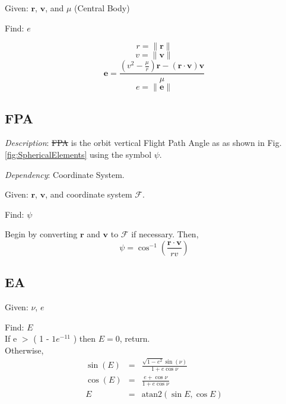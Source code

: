 \noindent Given:  $\mathbf{r}$, $\mathbf{v}$, and $\mu$ (Central
Body)

\noindent Find:  $e$

%
\begin{equation}
    r = \| \mathbf{r} \|
\end{equation}
%
\begin{equation}
    v = \| \mathbf{v} \|
\end{equation}
%
\begin{equation}
     \mathbf{e} = \displaystyle\frac{(v^2 - \displaystyle\frac{\mu}{r} )\mathbf{r}
     - (\mathbf{r}\cdot\mathbf{v}  )\mathbf{v}}{\mu}
\end{equation}
%
\begin{equation}
     e = \| \mathbf{e} \|
\end{equation}

\subsection{FPA} 

\noindent \textit{Description}: \st{FPA} is the orbit vertical
Flight Path Angle as as shown in Fig. \ref{fig:SphericalElements}
using the symbol $\psi$.

\noindent \textit{Dependency}:  Coordinate System.

\noindent Given:  $\mathbf{r}$, $\mathbf{v}$, and coordinate system
$\mathcal{F}$.

\noindent Find:  $\psi$

Begin by converting  $\mathbf{r}$ and $\mathbf{v}$ to  $\mathcal{F}$
if necessary.  Then,
%
\begin{equation}
    \psi = \cos^{-1}\left(  \frac{\mathbf{r} \cdot \mathbf{v} }{r v} \right)
\end{equation}
%

\subsection{EA} \label{sec:EccentricAnomaly}

Given: $\nu$, $e$

\noindent Find:  $E$\\
%

\noindent If e $>$ ( 1 - $1e^{-11}$ ) then $E = 0$, return.\\
%


\noindent Otherwise,
%
\begin{eqnarray}
    \sin(E) & = & \frac{\sqrt{1 - e^2} \sin(\nu)}{1+e \cos{\nu}}    \\    %
    \cos(E) & = & \frac{ e + \cos{\nu} }{1+e \cos{\nu}}   \\     %
    E & = & \mbox{atan2}(\sin{E},\cos{E})
\end{eqnarray}
%

